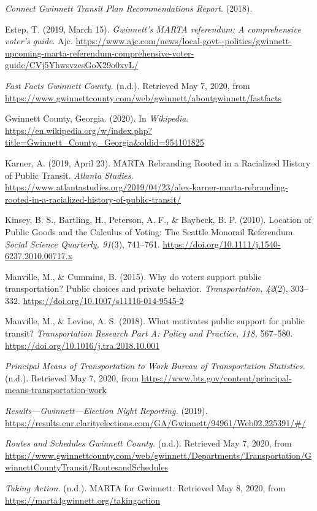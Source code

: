\documentclass[
]{article}
\begin{document}
\emph{Connect Gwinnett Transit Plan Recommendations Report}. (2018).

Estep, T. (2019, March 15). \emph{Gwinnett's MARTA referendum: A
comprehensive voter's guide}. Ajc.
\url{https://www.ajc.com/news/local-govt--politics/gwinnett-upcoming-marta-referendum-comprehensive-voter-guide/CVj5YhwsvzesGoX29o0xvL/}

\emph{Fast Facts \textbar{} Gwinnett County.} (n.d.). Retrieved May 7,
2020, from
\url{https://www.gwinnettcounty.com/web/gwinnett/aboutgwinnett/fastfacts}

Gwinnett County, Georgia. (2020). In \emph{Wikipedia}.
\url{https://en.wikipedia.org/w/index.php?title=Gwinnett_County,_Georgia\&oldid=954101825}

Karner, A. (2019, April 23). MARTA Rebranding Rooted in a Racialized
History of Public Transit. \emph{Atlanta Studies}.
\url{https://www.atlantastudies.org/2019/04/23/alex-karner-marta-rebranding-rooted-in-a-racialized-history-of-public-transit/}

Kinsey, B. S., Bartling, H., Peterson, A. F., \& Baybeck, B. P. (2010).
Location of Public Goods and the Calculus of Voting: The Seattle
Monorail Referendum. \emph{Social Science Quarterly, 91}(3), 741--761.
\url{https://doi.org/10.1111/j.1540-6237.2010.00717.x}

Manville, M., \& Cummins, B. (2015). Why do voters support public
transportation? Public choices and private behavior.
\emph{Transportation, 42}(2), 303--332.
\url{https://doi.org/10.1007/s11116-014-9545-2}

Manville, M., \& Levine, A. S. (2018). What motivates public support for
public transit? \emph{Transportation Research Part A: Policy and
Practice, 118,} 567--580.
\url{https://doi.org/10.1016/j.tra.2018.10.001}

\emph{Principal Means of Transportation to Work \textbar{} Bureau of
Transportation Statistics. }(n.d.). Retrieved May 7, 2020, from
\url{https://www.bts.gov/content/principal-means-transportation-work}

\emph{Results---Gwinnett---Election Night Reporting.} (2019).
\url{https://results.enr.clarityelections.com/GA/Gwinnett/94961/Web02.225391/\#/}

\emph{Routes and Schedules \textbar{} Gwinnett County. } (n.d.).
Retrieved May 7, 2020, from
\url{https://www.gwinnettcounty.com/web/gwinnett/Departments/Transportation/GwinnettCountyTransit/RoutesandSchedules}

\emph{Taking Action. } (n.d.). MARTA for Gwinnett. Retrieved May 8,
2020, from \url{https://marta4gwinnett.org/takingaction}
\end{document}
